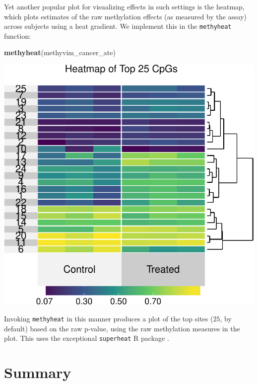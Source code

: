 \documentclass[9pt,a4paper,]{extarticle}
\newenvironment{Shaded}{\begin{snugshade}}{\end{snugshade}}
\newcommand{\KeywordTok}[1]{\textcolor[rgb]{0.13,0.29,0.53}{\textbf{#1}}}
\newcommand{\NormalTok}[1]{#1}
\theoremstyle{definition}
\theoremstyle{definition}
\theoremstyle{definition}
\theoremstyle{remark}
\begin{document}
Yet another popular plot for visualizing effects in such settings is the
heatmap, which plots estimates of the raw methylation effects (as measured by
the assay) across subjects using a heat gradient. We implement this in the
\texttt{methyheat} function:

\begin{Shaded}
\begin{Highlighting}[]
\KeywordTok{methyheat}\NormalTok{(methyvim_cancer_ate)}
\end{Highlighting}
\end{Shaded}

\begin{center}\includegraphics{paper_BiocF1000_files/figure-latex/methyvim-heatmap-1} \end{center}

Invoking \texttt{methyheat} in this manner produces a plot of the top sites (\(25\), by
default) based on the raw p-value, using the raw methylation measures in the
plot. This uses the exceptional \texttt{superheat} R package \citep{barter2017superheat}.

\hypertarget{summary}{%
\section{Summary}\label{summary}}
\end{document}
